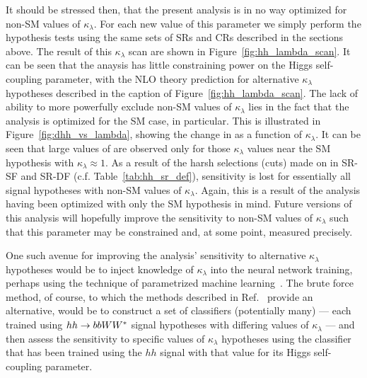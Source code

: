 It should be stressed then, that the present analysis is in no way optimized for non-SM values of $\kappa_{\lambda}$.
For each new value of this parameter we simply perform the hypothesis tests using the same
sets of SRs and CRs described in the sections above.
The result of this $\kappa_{\lambda}$ scan are shown in Figure~\ref{fig:hh_lambda_scan}.
It can be seen that the anaysis has little constraining power on the Higgs self-coupling parameter, with
the NLO theory prediction for alternative $\kappa_{\lambda}$ hypotheses described in the caption of Figure~\ref{fig:hh_lambda_scan}.
The lack of ability to more powerfully exclude non-SM values of $\kappa_{\lambda}$ lies in the
fact that the analysis is optimized for the SM case, in particular.
This is illustrated in Figure~\ref{fig:dhh_vs_lambda}, showing the change in \dhh as a function
of $\kappa_{\lambda}$.
It can be seen that large values of \dhh are observed only for those $\kappa_{\lambda}$ values near
the SM hypothesis with $\kappa_{\lambda} \approx 1$.
As a result of the harsh selections (cuts) made on \dhh in SR-SF and SR-DF (c.f. Table~\ref{tab:hh_sr_def}),
sensitivity is lost for essentially all signal hypotheses with non-SM values of $\kappa_{\lambda}$.
Again, this is a result of the analysis having been optimized with only the SM hypothesis in mind.
Future versions of this analysis will hopefully improve the sensitivity to non-SM values of $\kappa_{\lambda}$
such that this parameter may be constrained and, at some point, measured precisely.

One such avenue for improving the analysis' sensitivity to alternative $\kappa_{\lambda}$ hypotheses would be
to inject knowledge of $\kappa_{\lambda}$ into the neural network training, perhaps using
the technique of parametrized machine learning~\cite{Baldi:2016fzo}.
The brute force method, of course, to which the methods described in Ref.~\cite{Baldi:2016fzo} provide an alternative, would be to construct a set of classifiers (potentially many) --- each trained using $hh \rightarrow bbWW^*$ signal hypotheses with differing values of $\kappa_{\lambda}$ ---
and then assess the sensitivity to specific values of $\kappa_{\lambda}$ hypotheses using
the classifier that has been trained using the $hh$ signal with that value for its Higgs self-coupling parameter.

